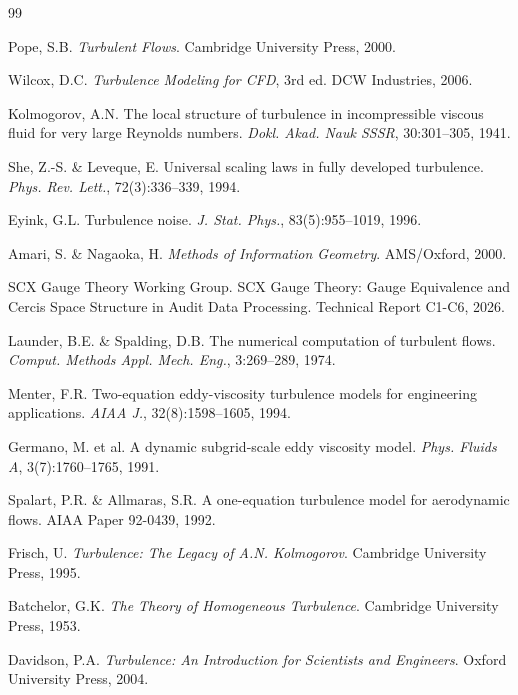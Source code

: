 \documentclass[12pt,a4paper]{article}
\theoremstyle{plain}
\theoremstyle{definition}
\theoremstyle{remark}
\begin{document}
\begin{thebibliography}{99}

Pope, S.B. \textit{Turbulent Flows}. Cambridge University Press, 2000.

Wilcox, D.C. \textit{Turbulence Modeling for CFD}, 3rd ed. DCW Industries, 2006.

Kolmogorov, A.N. The local structure of turbulence in incompressible viscous fluid for very large Reynolds numbers. \textit{Dokl. Akad. Nauk SSSR}, 30:301--305, 1941.

She, Z.-S. \& Leveque, E. Universal scaling laws in fully developed turbulence. \textit{Phys. Rev. Lett.}, 72(3):336--339, 1994.

Eyink, G.L. Turbulence noise. \textit{J. Stat. Phys.}, 83(5):955--1019, 1996.

Amari, S. \& Nagaoka, H. \textit{Methods of Information Geometry}. AMS/Oxford, 2000.

SCX Gauge Theory Working Group. SCX Gauge Theory: Gauge Equivalence and Cercis Space Structure in Audit Data Processing. Technical Report C1-C6, 2026.

Launder, B.E. \& Spalding, D.B. The numerical computation of turbulent flows. \textit{Comput. Methods Appl. Mech. Eng.}, 3:269--289, 1974.

Menter, F.R. Two-equation eddy-viscosity turbulence models for engineering applications. \textit{AIAA J.}, 32(8):1598--1605, 1994.

Germano, M. et al. A dynamic subgrid-scale eddy viscosity model. \textit{Phys. Fluids A}, 3(7):1760--1765, 1991.

Spalart, P.R. \& Allmaras, S.R. A one-equation turbulence model for aerodynamic flows. AIAA Paper 92-0439, 1992.

Frisch, U. \textit{Turbulence: The Legacy of A.N. Kolmogorov}. Cambridge University Press, 1995.

Batchelor, G.K. \textit{The Theory of Homogeneous Turbulence}. Cambridge University Press, 1953.

Davidson, P.A. \textit{Turbulence: An Introduction for Scientists and Engineers}. Oxford University Press, 2004.


\end{thebibliography}
\end{document}
